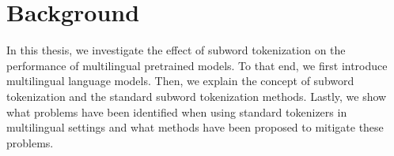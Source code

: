 



\chapter{Background}
\label{chap:background}



In this thesis, we investigate the effect of subword tokenization on the performance of multilingual pretrained models. To that end, we first introduce multilingual language models. Then, we explain the concept of subword tokenization and the standard subword tokenization methods. Lastly, we show what problems have been identified when using standard tokenizers in multilingual settings and what methods have been proposed to mitigate these problems.

